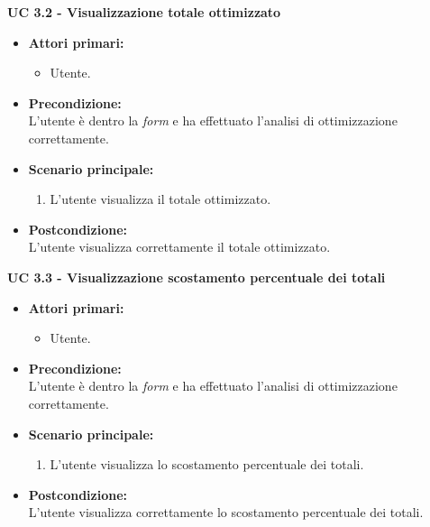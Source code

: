 \vspace{0.5cm}

\noindent \textbf{\large UC 3.2 - Visualizzazione totale ottimizzato}
\label{uc:visualizzazione-totale-ottimizzato}
\begin{itemize}

	\item \textbf{Attori primari: }
		\begin{itemize}
			\item Utente.
		\end{itemize}

	\item \textbf{Precondizione: }\\[0.3cm]
		L'utente è dentro la \textit{form} e ha effettuato l'analisi di ottimizzazione correttamente.

	\item \textbf{Scenario principale: }
		\begin{enumerate}
			\item L'utente visualizza il totale ottimizzato.
		\end{enumerate}
		

	\item \textbf{Postcondizione: }\\[0.3cm]
		L'utente visualizza correttamente il totale ottimizzato.

\end{itemize}

\vspace{0.5cm}

\noindent \textbf{\large UC 3.3 - Visualizzazione scostamento percentuale dei totali}
\label{uc:visualizzazione-scostamento-percentuale-totali}
\begin{itemize}

	\item \textbf{Attori primari: }
		\begin{itemize}
			\item Utente.
		\end{itemize}

	\item \textbf{Precondizione: }\\[0.3cm]
		L'utente è dentro la \textit{form} e ha effettuato l'analisi di ottimizzazione correttamente.

	\item \textbf{Scenario principale: }
		\begin{enumerate}
			\item L'utente visualizza lo scostamento percentuale dei totali.
		\end{enumerate}
		

	\item \textbf{Postcondizione: }\\[0.3cm]
		L'utente visualizza correttamente lo scostamento percentuale dei totali.

\end{itemize}

